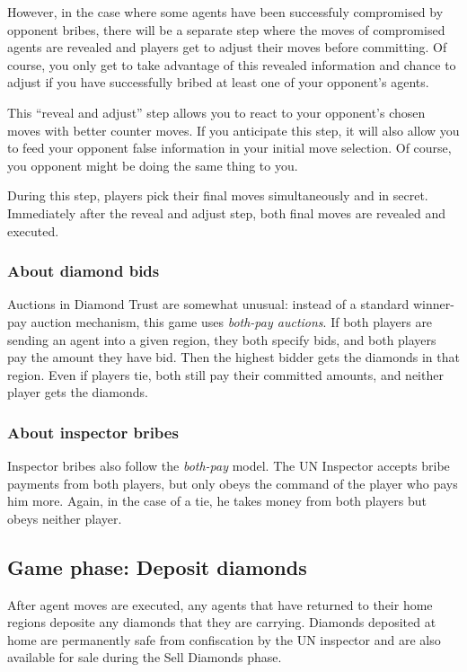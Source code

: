 \documentclass[8pt]{extbook}
\begin{document}
However, in the case where some agents have been successfuly compromised by opponent bribes, there will be a separate step where the moves of compromised agents are revealed and players get to adjust their moves before committing.  Of course, you only get to take advantage of this revealed information and chance to adjust if you have successfully bribed at least one of your opponent's agents.

This ``reveal and adjust'' step allows you to react to your opponent's chosen moves with better counter moves.  If you anticipate this step, it will also allow you to feed your opponent false information in your initial move selection.  Of course, you opponent might be doing the same thing to you.

During this step, players pick their final moves simultaneously and in secret.  Immediately after the reveal and adjust step, both final moves are revealed and executed.

\subsubsection{About diamond bids}
Auctions in Diamond Trust are somewhat unusual:  instead of a standard winner-pay auction mechanism, this game uses {\it both-pay auctions}.  If both players are sending an agent into a given region, they both specify bids, and both players pay the amount they have bid.  Then the highest bidder gets the diamonds in that region.  Even if players tie, both still pay their committed amounts, and neither player gets the diamonds.

\subsubsection{About inspector bribes}
Inspector bribes also follow the {\it both-pay} model.  The UN Inspector accepts bribe payments from both players, but only obeys the command of the player who pays him more.  Again, in the case of a tie, he takes money from both players but obeys neither player.

\subsection{Game phase:  Deposit diamonds}
After agent moves are executed, any agents that have returned to their home regions deposite any diamonds that they are carrying.  Diamonds deposited at home are permanently safe from confiscation by the UN inspector and are also available for sale during the Sell Diamonds phase.
\end{document}
